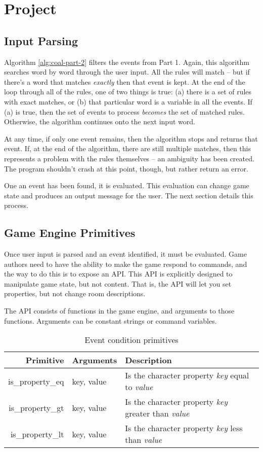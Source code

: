 \documentclass{article}
\newcommand{\enterProblemHeader}[1]{
}
\newcommand{\exitProblemHeader}[1]{
\nobreak\extramarks{#1}{}\nobreak
}
\newcounter{homeworkProblemCounter} %
\newcommand{\homeworkProblemName}{}
\newenvironment{homeworkProblem}[1][Problem \arabic{homeworkProblemCounter}]{ %
\stepcounter{homeworkProblemCounter} %
\renewcommand{\homeworkProblemName}{#1} %
\section{\homeworkProblemName} %
\enterProblemHeader{\homeworkProblemName} %
}{
\exitProblemHeader{\homeworkProblemName} %
}
\newcommand{\homeworkSectionName}{}
\newenvironment{homeworkSection}[1]{ %
\renewcommand{\homeworkSectionName}{#1} %
\subsection{\homeworkSectionName} %
\enterProblemHeader{\homeworkProblemName\ [\homeworkSectionName]} %
}{
\enterProblemHeader{\homeworkProblemName} %
}
\begin{document}
\begin{homeworkProblem}[Project]
\begin{homeworkSection}{Input Parsing}
	Algorithm \ref{alg:coal-part-2} filters the events from Part 1. Again, this algorithm searches word by word through the user input. All the rules will match -- but if there's a word that matches \textit{exactly} then that event is kept. At the end of the loop through all of the rules, one of two things is true: (a) there is a set of rules with exact matches, or (b) that particular word is a variable in all the events. If (a) is true, then the set of events to process \textit{becomes} the set of matched rules. Otherwise, the algorithm continues onto the next input word.

	At any time, if only one event remains, then the algorithm stops and returns that event. If, at the end of the algorithm, there are still multiple matches, then this represents a problem with the rules themselves -- an ambiguity has been created. The program shouldn't crash at this point, though, but rather return an error.

	One an event has been found, it is evaluated. This evaluation can change game state and produces an output message for the user. The next section details this process.

\end{homeworkSection}

\begin{homeworkSection}{Game Engine Primitives}
	Once user input is parsed and an event identified, it must be evaluated. Game authors need to have the ability to make the game respond to commands, and the way to do this is to expose an API. This API is explicitly designed to manipulate game state, but not content. That is, the API will let you set properties, but not change room descriptions.

	The API consists of functions in the game engine, and arguments to those functions. Arguments can be constant strings or command variables.

	\begin{table}
		\begin{tabularx}{\textwidth}{|r|l|X|}
			\hline
			Primitive & Arguments & Description \\
			\hline \hline
			is\_property\_eq & key, value & Is the character property \textit{key} equal to \textit{value} \\
			is\_property\_gt & key, value & Is the character property \textit{key} greater than \textit{value} \\
			is\_property\_lt & key, value & Is the character property \textit{key} less than \textit{value} \\
			\hline
		\end{tabularx}
		\caption{Event condition primitives}
		\label{tab:event-condition-primitives}
	\end{table}


\end{homeworkSection}
\end{homeworkProblem}
\end{document}
